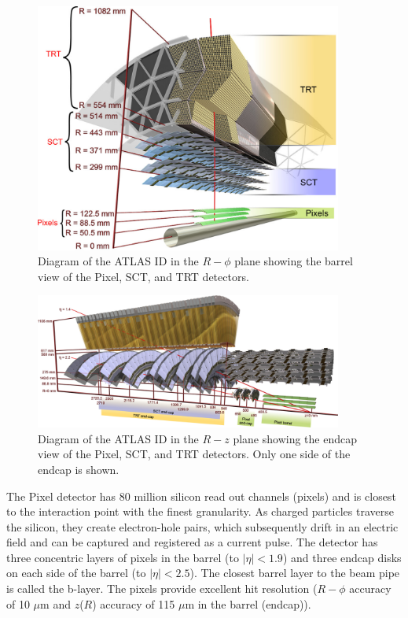 \begin{figure}[!t]
\centering 
\includegraphics[width=0.9\textwidth]{figs/lhc/IDBarrel-eps-converted-to}
\caption{ Diagram of the ATLAS ID in the $R-\phi$ plane showing the barrel view of the Pixel, SCT, and TRT detectors.
}
\label{figure:lhc_id_barrel}
\end{figure}

\begin{figure}[!t]
\centering 
\includegraphics[width=0.9\textwidth]{figs/lhc/IDEndcap-eps-converted-to}
\caption{ Diagram of the ATLAS ID in the $R-z$ plane showing the endcap view of the Pixel, SCT, and TRT detectors. Only one side of the endcap is shown. 
}
\label{figure:lhc_id_endcap}
\end{figure}

The Pixel detector has 80 million silicon read out channels (pixels) and is closest to the interaction point with the finest granularity. As charged particles traverse the silicon, they create electron-hole pairs, which subsequently drift in an electric field and can be captured and registered as a current pulse. The detector has three concentric layers of pixels in the barrel (to $|\eta| < 1.9$) and three endcap disks on each side of the barrel (to $|\eta| < 2.5$). The closest barrel layer to the beam pipe is called the b-layer. The pixels provide excellent hit resolution ($R-\phi$ accuracy of 10 $\mu$m and $z$($R$) accuracy of 115 $\mu$m in the barrel (endcap)).

